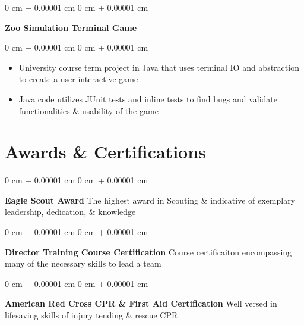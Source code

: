 \documentclass[10pt, letterpaper]{article}
\newenvironment{highlights}{
    \begin{itemize}[
        topsep=0.10 cm,
        parsep=0.10 cm,
        partopsep=0pt,
        itemsep=0pt,
        leftmargin=0 cm + 10pt
    ]
}{
    \end{itemize}
} %
\newenvironment{onecolentry}{
    \begin{adjustwidth}{
        0 cm + 0.00001 cm
    }{
        0 cm + 0.00001 cm
    }
}{
    \end{adjustwidth}
} %
\newenvironment{twocolentry}[2][]{
    \onecolentry%
    \def\secondColumn{#2}
    \setcolumnwidth{\fill, 6.0 cm}
    \begin{paracol}{2}
}{
    \switchcolumn\raggedleft\secondColumn%
    \end{paracol}
    \endonecolentry%
} %
\begin{document}
        
        \vspace{0.2 cm}

        \begin{twocolentry}{
            \href{https://github.com/thatchereames/animal-game}{\color{secondaryColor}{github.com/thatchereames/animal-game}}
        }
            \textbf{Zoo Simulation Terminal Game}\end{twocolentry}

        \vspace{0.10 cm}
        \begin{onecolentry}
            \begin{highlights}
                \item University course term project in Java that uses terminal IO and abstraction to create a user interactive game
                \item Java code utilizes JUnit tests and inline tests to find bugs and validate functionalities \& usability of the game 
            \end{highlights}
        \end{onecolentry}




    
    {\color{secondaryColor}\section{Awards \& Certifications}}

        \begin{onecolentry}
            \textbf{Eagle Scout Award} The highest award in Scouting \& indicative of exemplary leadership, dedication, \& knowledge
        \end{onecolentry}

        \vspace{0.1 cm}

        \begin{onecolentry}
            \textbf{Director Training Course Certification} Course certificaiton encompassing many of the necessary skills to lead a team
        \end{onecolentry}

        \vspace{0.1 cm}

        \begin{onecolentry}
            \textbf{American Red Cross CPR \& First Aid Certification} Well versed in lifesaving skills of injury tending \& rescue CPR
        \end{onecolentry}
    
\end{document}
